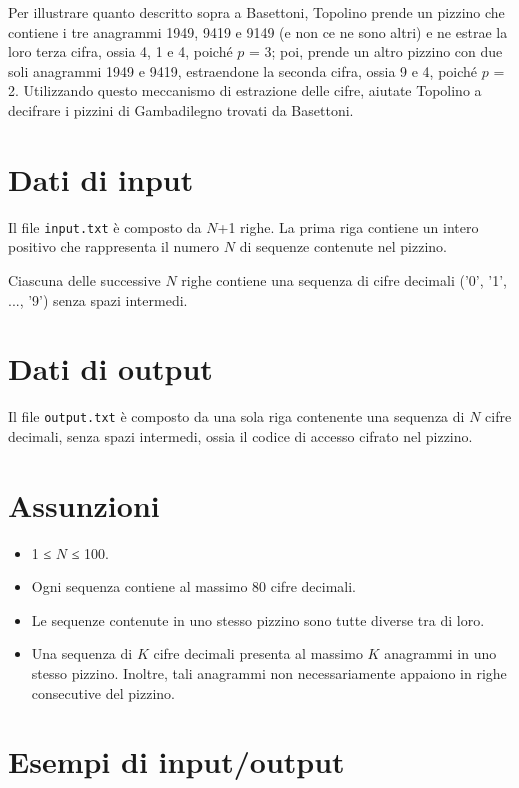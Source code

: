 \documentclass[a4paper,11pt]{article}
\begin{document}
Per illustrare quanto descritto sopra a Basettoni, Topolino prende un
pizzino che contiene i tre anagrammi 1949, 9419 e 9149 (e non ce ne
sono altri) e ne estrae la loro terza cifra, ossia 4, 1 e 4,
poiché $p$ = 3; poi, prende un altro pizzino con due
soli anagrammi 1949 e 9419, estraendone la seconda cifra, ossia 9 e 4,
poiché $p$ = 2. Utilizzando questo meccanismo di
estrazione delle cifre, aiutate Topolino a decifrare i pizzini di
Gambadilegno trovati da Basettoni.


\section*{Dati di input}
  Il file \texttt{input.txt} è composto da $N$+1
righe.
La prima riga contiene un intero positivo che rappresenta il numero
$N$ di sequenze contenute nel pizzino.

Ciascuna delle successive $N$ righe contiene una sequenza di
cifre decimali ('0', '1', ..., '9') senza spazi intermedi. 


\section*{Dati di output}
  
Il file \texttt{output.txt} è composto da una sola riga
contenente una sequenza di $N$ cifre decimali, senza spazi
intermedi, ossia il codice di accesso cifrato nel pizzino.

  \section*{Assunzioni}
  \begin{itemize}
  
    \item  1 ≤ $N$ ≤ 100.
    \item  Ogni sequenza contiene al massimo 80 cifre decimali.
    \item  Le sequenze contenute in uno stesso pizzino sono tutte diverse
tra di loro.
    \item  Una sequenza di $K$ cifre decimali presenta al massimo
$K$ anagrammi in uno stesso pizzino. Inoltre, tali anagrammi
non necessariamente appaiono in righe consecutive del pizzino.
  \end{itemize}

\section*{Esempi di input/output}
\end{document}
